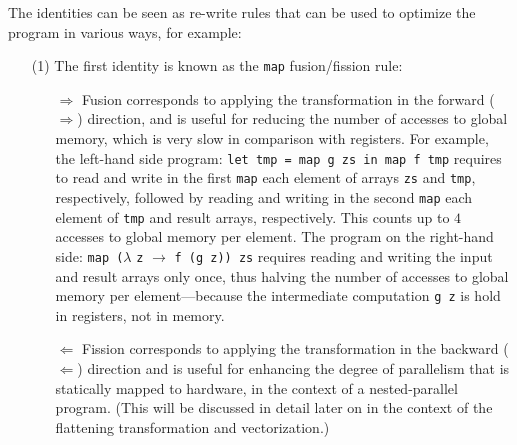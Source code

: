 \documentclass[acmsmall,review]{acmart}\settopmatter{printfolios=true,printccs=false,printacmref=false}
\begin{document}
The identities can be seen as re-write rules that can be used
to optimize the program in various ways, for example:
\begin{itemize}
    \item[(1)] The first identity is known as the \lstinline{map} fusion/fission
        rule:
        \begin{itemize}
            \item[$\Rightarrow$] Fusion corresponds to applying the transformation 
                    in the forward ($\Rightarrow$) direction, and is 
                    useful for reducing the number of accesses to
                    global memory, which is very slow in comparison
                    with registers. For example, the left-hand side
                    program: \lstinline{let tmp = map g zs in map f tmp}
                    requires to read and write in the first \lstinline{map}
                    each element of arrays {\tt zs} and {\tt tmp}, respectively,
                    followed by reading and writing in the second 
                    \lstinline{map} each element of {\tt tmp} and result
                    arrays, respectively. This counts up to $4$ accesses
                    to global memory per element. The program on the
                    right-hand side: \lstinline{map (}$\lambda$ {\tt z} $\rightarrow$ {\tt f (g z)) zs} 
                    requires reading and writing the input and result arrays
                    only once, thus halving the number of accesses to global
                    memory per element---because the intermediate computation
                    {\tt g z} is hold in registers, not in memory.
            \item[$\Leftarrow$] Fission corresponds to applying the transformation 
                    in the backward ($\Leftarrow$) direction and is useful
                    for enhancing the degree of parallelism that is statically mapped
                    to hardware, in the context of a nested-parallel program.
                    (This will be discussed in detail later on in the context 
                    of the flattening transformation and vectorization.)
        \end{itemize}


\end{itemize}
\end{document}
